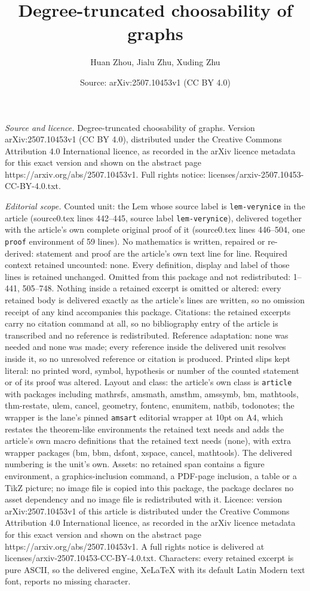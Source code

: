 \documentclass[10pt,a4paper]{amsart}
\title[Degree-truncated choosability of graphs]{Degree-truncated choosability of graphs}
\author{Huan Zhou, Jialu Zhu, Xuding Zhu}
\date{Source: arXiv:2507.10453v1 (CC BY 4.0)}
\begin{document}
\maketitle

\noindent\emph{Source and licence.} Degree-truncated choosability of graphs. Version arXiv:2507.10453v1 (CC BY 4.0), distributed under the Creative Commons Attribution 4.0 International licence, as recorded in the arXiv licence metadata for this exact version and shown on the abstract page https://arxiv.org/abs/2507.10453v1. Full rights notice: licenses/arxiv-2507.10453-CC-BY-4.0.txt.\par\smallskip

\noindent\textit{Editorial scope.} Counted unit: the Lem whose source label is \texttt{lem-verynice} in the article (source0.tex lines 442--445, source label \texttt{lem-verynice}), delivered together with the article's own complete original proof of it (source0.tex lines 446--504, one \texttt{proof} environment of 59 lines). No mathematics is written, repaired or re-derived: statement and proof are the article's own text line for line. Required context retained uncounted: none. Every definition, display and label of those lines is retained unchanged. Omitted from this package and not redistributed: 1--441, 505--748. Nothing inside a retained excerpt is omitted or altered: every retained body is delivered exactly as the article's lines are written, so no omission receipt of any kind accompanies this package. Citations: the retained excerpts carry no citation command at all, so no bibliography entry of the article is transcribed and no reference is redistributed. Reference adaptation: none was needed and none was made; every reference inside the delivered unit resolves inside it, so no unresolved reference or citation is produced. Printed slips kept literal: no printed word, symbol, hypothesis or number of the counted statement or of its proof was altered. Layout and class: the article's own class is \texttt{article} with packages including mathrsfs, amsmath, amsthm, amssymb, bm, mathtools, thm-restate, ulem, cancel, geometry, fontenc, enumitem, natbib, todonotes; the wrapper is the lane's pinned \texttt{amsart} editorial wrapper at 10pt on A4, which restates the theorem-like environments the retained text needs and adds the article's own macro definitions that the retained text needs (none), with extra wrapper packages (bm, bbm, dsfont, xspace, cancel, mathtools). The delivered numbering is the unit's own. Assets: no retained span contains a figure environment, a graphics-inclusion command, a PDF-page inclusion, a table or a TikZ picture; no image file is copied into this package, the package declares no asset dependency and no image file is redistributed with it. Licence: version arXiv:2507.10453v1 of this article is distributed under the Creative Commons Attribution 4.0 International licence, as recorded in the arXiv licence metadata for this exact version and shown on the abstract page https://arxiv.org/abs/2507.10453v1. A full rights notice is delivered at licenses/arxiv-2507.10453-CC-BY-4.0.txt. Characters: every retained excerpt is pure ASCII, so the delivered engine, XeLaTeX with its default Latin Modern text font, reports no missing character.
\end{document}

